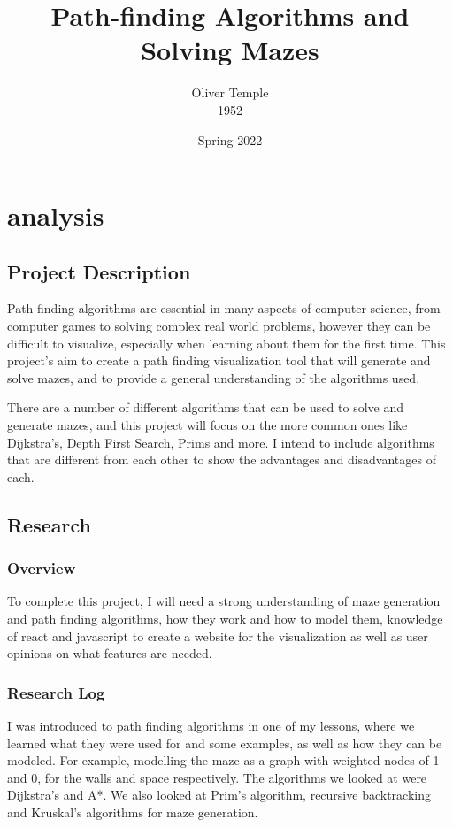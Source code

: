 \documentclass[titlepage]{article}
\title{Path-finding Algorithms and Solving Mazes}
\author{Oliver Temple \\ 1952}
\date{Spring 2022}
\begin{document}
\maketitle
\tableofcontents
\newpage
\section{analysis}
\subsection{Project Description}
Path finding algorithms are essential in many aspects of computer science, from computer games to solving complex real world problems, however they can be difficult to visualize, especially when learning about them for the first time. This project's aim to create a path finding visualization tool that will generate and solve mazes, and to provide a general understanding of the algorithms used. 

There are a number of different algorithms that can be used to solve and generate mazes, and this project will focus on the more common ones like Dijkstra's, Depth First Search, Prims and more. I intend to include algorithms that are different from each other to show the advantages and disadvantages of each.
\subsection{Research}
\subsubsection{Overview}
To complete this project, I will need a strong understanding of maze generation and path finding algorithms, how they work and how to model them, knowledge of react and javascript to create a website for the visualization as well as user opinions on what features are needed.
\subsubsection{Research Log}
I was introduced to path finding algorithms in one of my lessons, where we learned what they were used for and some examples, as well as how they can be modeled. For example, modelling the maze as a graph with weighted nodes of 1 and 0, for the walls and space respectively. The algorithms we looked at were Dijkstra's and A*. We also looked at Prim's algorithm, recursive backtracking and Kruskal's algorithms for maze generation.
\end{document}
